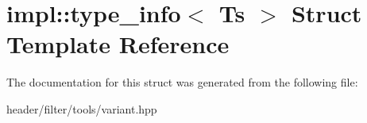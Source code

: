 \hypertarget{structimpl_1_1type__info}{}\section{impl\+:\+:type\+\_\+info$<$ Ts $>$ Struct Template Reference}
\label{structimpl_1_1type__info}


The documentation for this struct was generated from the following file\+:\begin{DoxyCompactItemize}
\item 
header/filter/tools/variant.\+hpp\end{DoxyCompactItemize}
